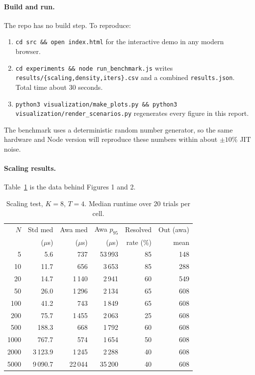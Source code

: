 \documentclass[10pt,a4paper,twocolumn]{article}
\begin{document}
\paragraph*{Build and run.}
The repo has no build step. To reproduce:
\begin{enumerate}
  \item \texttt{cd src \&\& open index.html} for the interactive demo
        in any modern browser.
  \item \texttt{cd experiments \&\& node run\_benchmark.js} writes
        \texttt{results/\{scaling,density,iters\}.csv} and a combined
        \texttt{results.json}. Total time about 30 seconds.
  \item \texttt{python3 visualization/make\_plots.py \&\& python3
        visualization/render\_scenarios.py} regenerates every figure
        in this report.
\end{enumerate}
The benchmark uses a deterministic random number generator, so the
same hardware and Node version will reproduce these numbers within
about $\pm 10\%$ JIT noise.

\paragraph*{Scaling results.}
Table~\ref{tab:appendix-scaling} is the data behind Figures 1 and 2.

\begin{table}[h]\centering\small
\caption{Scaling test, $K{=}8$, $T{=}4$. Median runtime over 20
trials per cell.}\label{tab:appendix-scaling}
\begin{tabular}{@{}rrrrrr@{}}
\toprule
$N$ & Std med & Awa med & Awa $p_{95}$ & Resolved & Out (awa) \\
    & ($\mu$s) & ($\mu$s)& ($\mu$s)     & rate (\%)  & mean        \\
\midrule
   5 &     5.6 &    737 &    53\,993 & 85 &  148 \\
  10 &    11.7 &    656 &     3\,653 & 85 &  288 \\
  20 &    14.7 &  1\,140 &     2\,941 & 60 &  549 \\
  50 &    26.0 &  1\,296 &     2\,134 & 65 &  608 \\
 100 &    41.2 &    743 &     1\,849 & 65 &  608 \\
 200 &    75.7 &  1\,455 &     2\,063 & 25 &  608 \\
 500 &   188.3 &    668 &     1\,792 & 60 &  608 \\
1000 &   767.7 &    574 &     1\,654 & 50 &  608 \\
2000 & 3\,123.9&  1\,245 &     2\,288 & 40 &  608 \\
5000 & 9\,090.7& 22\,044 &    35\,200 & 40 &  608 \\
\bottomrule
\end{tabular}
\end{table}
\end{document}

